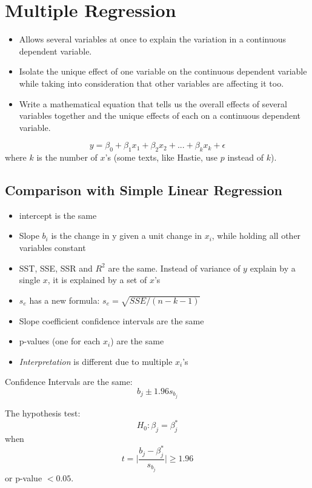 \documentclass[11pt, oneside]{article}   	%
\begin{document}
\section{Multiple Regression}
\begin{itemize}

\item{Allows several variables at once to explain the variation in a continuous dependent variable. }

\item{Isolate the unique effect of one variable on the
continuous dependent variable while taking into
consideration that other variables are affecting it too.}

\item{Write a mathematical equation that tells us the overall
effects of several variables together and the unique
effects of each on a continuous dependent variable.}

\end{itemize}

\[
y = \beta_0 + \beta_1 x_1 + \beta_2 x_2 + ... + \beta_k x_k + \epsilon
\]
where $k$ is the number of $x$'s (some texts, like Hastie, use $p$ instead of $k$).

\subsection{Comparison with Simple Linear Regression}

\begin{itemize}
\item{intercept is the same}
\item{Slope $b_i$ is the change in y given a unit change in $x_i$, while holding all other variables constant}
\item{SST, SSE, SSR and $R^2$ are the same. Instead of variance of $y$ explain by a single $x$, it is explained by a set of $x$'s}
\item{$s_e$ has a new formula: $s_e = \sqrt{SSE / (n-k-1)} $}
\item{Slope coefficient confidence intervals are the same}
\item{p-values (one for each $x_i$) are the same}
\item{\textit{Interpretation} is different due to multiple $x_i$'s}
\end{itemize}

Confidence Intervals are the same:
\[
b_j \pm 1.96 s_{b_j}
\]

The hypothesis test:
\[
H_0 : \beta_j = \beta_j^*
\]
when 
\[
t = \Bigg\lvert \frac{b_j - \beta_j^*} { s_{b_j} } \Bigg\lvert \geq 1.96
\]
 or p-value $< 0.05$.
\end{document}
